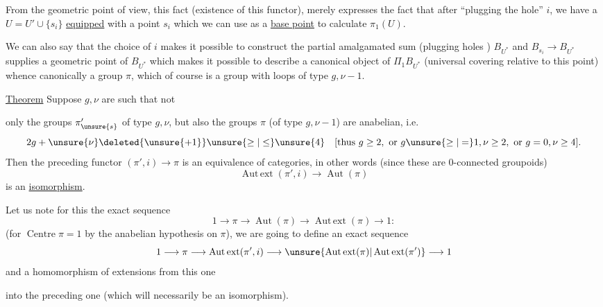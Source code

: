 From the geometric point of view, this fact (existence of this functor), merely expresses the fact that after ``plugging the hole'' \(i\), we have a  \(U=U'\cup\{s_i\}\) \uline{equipped} with a point \(s_i\) which we can use as a \uline{base point}  to calculate \(\pi_1(U)\).

We can also say that the choice of \(i\) makes it possible to construct the partial amalgamated sum (plugging holes ) \(B_{U^*}\)
and \(B_{s_i}\longrightarrow B_{U^*}\) supplies a geometric point of \(B_{U^*}\) which makes it possible to describe a canonical object of \(\Pi_1B_{U^*}\) (universal covering relative to this point) whence canonically a group \(\pi\), which of course is a group with loops of type \(g,\nu-1\).

\uline{Theorem} Suppose \(g,\nu\) are such that not


only the groups \(\pi'_{\unsure{s}}\) of type \(g,\nu\), but also the groups \(\pi\) (of type \(g,\nu-1\)) are anabelian, i.e.
\[
2g+\unsure{\nu}\deleted{\unsure{+1}}\unsure{\ge|\le}\unsure{4}
\quad
[\text{thus }g\ge2,\ \text{or }g\unsure{\ge|=}1,\nu\ge2,\ \text{or }g=0,\nu\ge4].
\]
Then the preceding functor \((\pi',i)\longrightarrow\pi\) is an equivalence of categories, in other words (since these are \(0\)-connected groupoids)
\[
\operatorname{Aut\,ext}(\pi',i)\longrightarrow\operatorname{Aut}(\pi)
\]
is an \uline{isomorphism}.

Let us note for this  the exact sequence
\[
1\longrightarrow\pi\longrightarrow\operatorname{Aut}(\pi)
\longrightarrow\operatorname{Aut\,ext}(\pi)\longrightarrow1:
\]
(for \(\operatorname{Centre}\pi=1\) by the anabelian hypothesis on \(\pi\)),  we are going to define an exact sequence
\[
1\longrightarrow\pi\longrightarrow\operatorname{Aut\,ext}(\pi',i)
\longrightarrow\unsure{\operatorname{Aut\,ext}(\pi)|\operatorname{Aut\,ext}(\pi')}
\longrightarrow1
\]
and a homomorphism of extensions from this one


into the preceding one (which will necessarily be an isomorphism).

